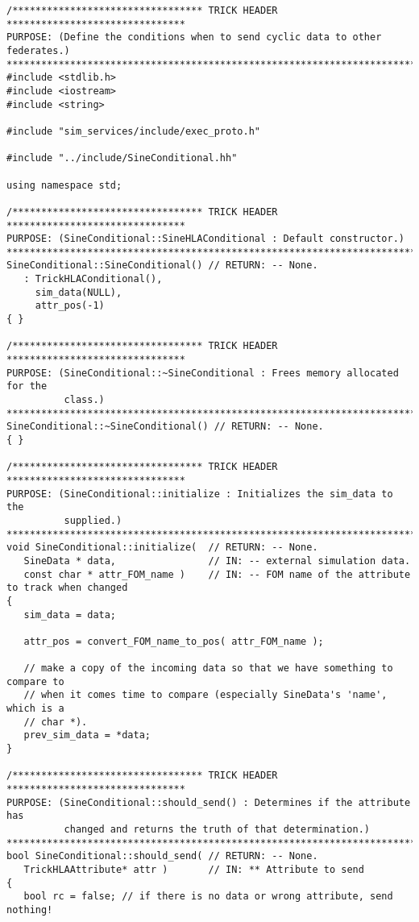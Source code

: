 \begin{lstlisting}[caption={{\tt SineConditional} code},label={list:sine-conditional-code}]
/********************************* TRICK HEADER *******************************
PURPOSE: (Define the conditions when to send cyclic data to other federates.)
*******************************************************************************/
#include <stdlib.h>
#include <iostream>
#include <string>

#include "sim_services/include/exec_proto.h"

#include "../include/SineConditional.hh"

using namespace std;

/********************************* TRICK HEADER *******************************
PURPOSE: (SineConditional::SineHLAConditional : Default constructor.)
*******************************************************************************/
SineConditional::SineConditional() // RETURN: -- None.
   : TrickHLAConditional(),
     sim_data(NULL),
     attr_pos(-1)
{ }

/********************************* TRICK HEADER *******************************
PURPOSE: (SineConditional::~SineConditional : Frees memory allocated for the
          class.)
*******************************************************************************/
SineConditional::~SineConditional() // RETURN: -- None.
{ }

/********************************* TRICK HEADER *******************************
PURPOSE: (SineConditional::initialize : Initializes the sim_data to the
          supplied.)
*******************************************************************************/
void SineConditional::initialize(  // RETURN: -- None.
   SineData * data,                // IN: -- external simulation data.
   const char * attr_FOM_name )    // IN: -- FOM name of the attribute to track when changed
{
   sim_data = data;

   attr_pos = convert_FOM_name_to_pos( attr_FOM_name );
   
   // make a copy of the incoming data so that we have something to compare to
   // when it comes time to compare (especially SineData's 'name', which is a 
   // char *).
   prev_sim_data = *data;
}

/********************************* TRICK HEADER *******************************
PURPOSE: (SineConditional::should_send() : Determines if the attribute has
          changed and returns the truth of that determination.)
*******************************************************************************/
bool SineConditional::should_send( // RETURN: -- None.
   TrickHLAAttribute* attr )       // IN: ** Attribute to send
{
   bool rc = false; // if there is no data or wrong attribute, send nothing!


\end{lstlisting}
